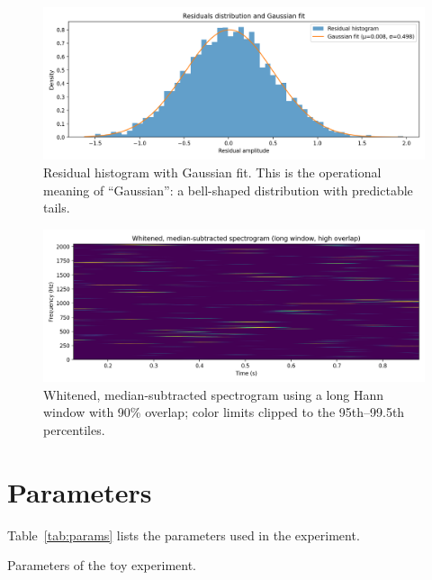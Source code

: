 \documentclass[11pt,a4paper]{article}
\begin{document}
\begin{figure}[h!]\centering
\includegraphics[width=0.95\linewidth]{fig3_residual_hist.png}
\caption{Residual histogram with Gaussian fit. This is the operational meaning of ``Gaussian'': a bell-shaped distribution with predictable tails.}
\end{figure}

\begin{figure}[h!]\centering
\includegraphics[width=0.95\linewidth]{fig4_spectrogram.png}
\caption{Whitened, median-subtracted spectrogram using a long Hann window with 90\% overlap; color limits clipped to the 95th--99.5th percentiles.}
\end{figure}

\appendix
\section*{Parameters}
\noindent Table~\ref{tab:params} lists the parameters used in the experiment.
\begin{table}[h!]\centering
\caption{Parameters of the toy experiment.}
\label{tab:params}

\end{table}
\end{document}
